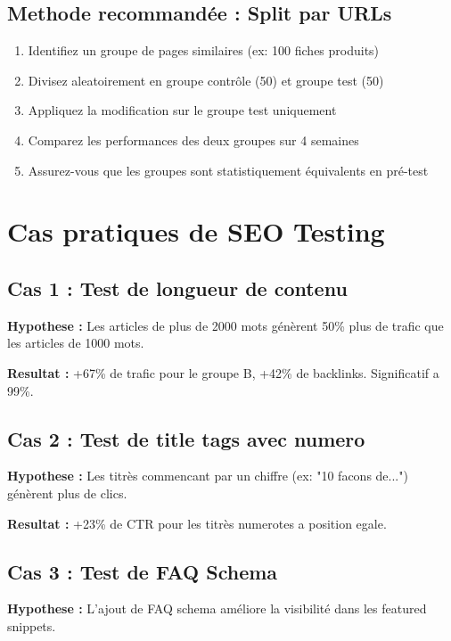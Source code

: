 \subsection{Methode recommandée : Split par URLs}

\begin{enumerate}
    \item Identifiez un groupe de pages similaires (ex: 100 fiches produits)
    \item Divisez aleatoirement en groupe contrôle (50) et groupe test (50)
    \item Appliquez la modification sur le groupe test uniquement
    \item Comparez les performances des deux groupes sur 4 semaines
    \item Assurez-vous que les groupes sont statistiquement équivalents en pré-test
\end{enumerate}

\section{Cas pratiques de SEO Testing}

\subsection{Cas 1 : Test de longueur de contenu}

\textbf{Hypothese :} Les articles de plus de 2000 mots génèrent 50\% plus de trafic que les articles de 1000 mots.

\textbf{Resultat :} +67\% de trafic pour le groupe B, +42\% de backlinks. Significatif a 99\%.

\subsection{Cas 2 : Test de title tags avec numero}

\textbf{Hypothese :} Les titrès commencant par un chiffre (ex: "10 facons de...") génèrent plus de clics.

\textbf{Resultat :} +23\% de CTR pour les titrès numerotes a position egale.

\subsection{Cas 3 : Test de FAQ Schema}

\textbf{Hypothese :} L'ajout de FAQ schema améliore la visibilité dans les featured snippets.

